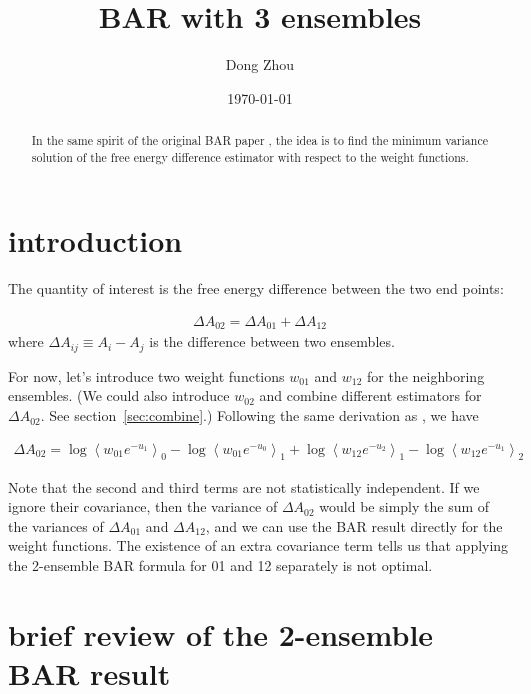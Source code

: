 \documentclass[notitlepage, amsmath, amssymb, aps]{revtex4-1}
\begin{document}
\title{BAR with 3 ensembles}

\author{Dong Zhou}
\date{\today}

\begin{abstract}
    In the same spirit of the original BAR paper \cite{bennett76}, the idea is to find the minimum variance solution
of the free energy difference estimator with respect to the weight functions.
\end{abstract}

\maketitle

\section{introduction}

The quantity of interest is the free energy difference between the two end points:

\begin{align}
\Delta A_{02} = \Delta A_{01} + \Delta A_{12}
\end{align}
where $\Delta A_{ij} \equiv A_i - A_j$ is the difference between two ensembles.

For now, let's introduce two weight functions $w_{01}$ and $w_{12}$ for the neighboring ensembles.
(We could also introduce $w_{02}$ and combine different estimators for $\Delta A_{02}$. See section~\ref{sec:combine}.)
Following the same derivation as \cite{bennett76}, we have

\begin{align}
\Delta A_{02} = \log\left<w_{01} e^{-u_1}\right>_0 - \log\left<w_{01}e^{-u_0}\right>_1
              + \log\left<w_{12} e^{-u_2}\right>_1 - \log\left<w_{12}e^{-u_1}\right>_2
\end{align}

Note that the second and third terms are not statistically independent.
If we ignore their covariance, then the variance of $\Delta A_{02}$ would be simply the sum of
the variances of $\Delta A_{01}$ and $\Delta A_{12}$, and we can use the BAR result directly for the weight functions.
The existence of an extra covariance term tells us that applying the 2-ensemble BAR formula for 01 and 12 separately is not optimal.

\section{brief review of the 2-ensemble BAR result}
\end{document}
